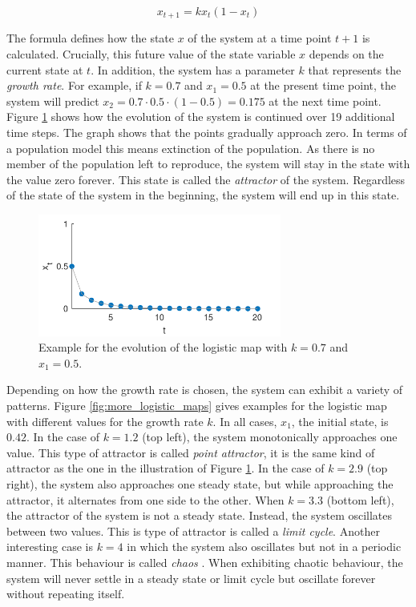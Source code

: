 \begin{equation}
x_{t+1} = kx_t(1-x_t)
\label{eq:logistic_map}
\end{equation}

The formula defines how the state $x$ of the system at a time point $t+1$ is calculated. Crucially, this future value of the state variable $x$ depends on the current state at $t$. In addition, the system has a parameter $k$ that represents the \emph{growth rate}. For example, if $k = 0.7$ and $x_1 = 0.5$ at the present time point, the system will predict $x_2 = 0.7 \cdot 0.5 \cdot (1-0.5) = 0.175$ at the next time point. Figure \ref{fig:logistic_map} shows how the evolution of the system is continued over 19 additional time steps. The graph shows that the points gradually approach zero. In terms of a population model this means extinction of the population. As there is no member of the population left to reproduce, the system will stay in the state with the value zero forever. This state is called the \emph{attractor} of the system. Regardless of the state of the system in the beginning, the system will end up in this state.

\begin{figure}
\includegraphics[width=8cm]{figures/ch3/logistic_map.pdf}
\caption{Example for the evolution of the logistic map with $k = 0.7$ and $x_1 = 0.5$.}
\label{fig:logistic_map}

\end{figure}

Depending on how the growth rate is chosen, the system can exhibit a variety of patterns. Figure \ref{fig:more_logistic_maps} gives examples for the logistic map with different values for the growth rate $k$. In all cases, $x_1$, the initial state, is $0.42$. In the case of $k = 1.2$ (top left), the system monotonically approaches one value. This type of attractor is called \emph{point attractor}, it is the same kind of attractor as the one in the illustration of Figure \ref{fig:logistic_map}. In the case of $k = 2.9$ (top right), the system also approaches one steady state, but while approaching the attractor, it alternates from one side to the other. When $k = 3.3$ (bottom left), the attractor of the system is not a steady state. Instead, the system oscillates between two values. This is type of attractor is called a \emph{limit cycle}. Another interesting case is $k = 4$ in which the system also oscillates but not in a periodic manner. This behaviour is called \emph{chaos} \citep{KaplanGlass1995}. When exhibiting chaotic behaviour, the system will never settle in a steady state or limit cycle but oscillate forever without repeating itself. 

